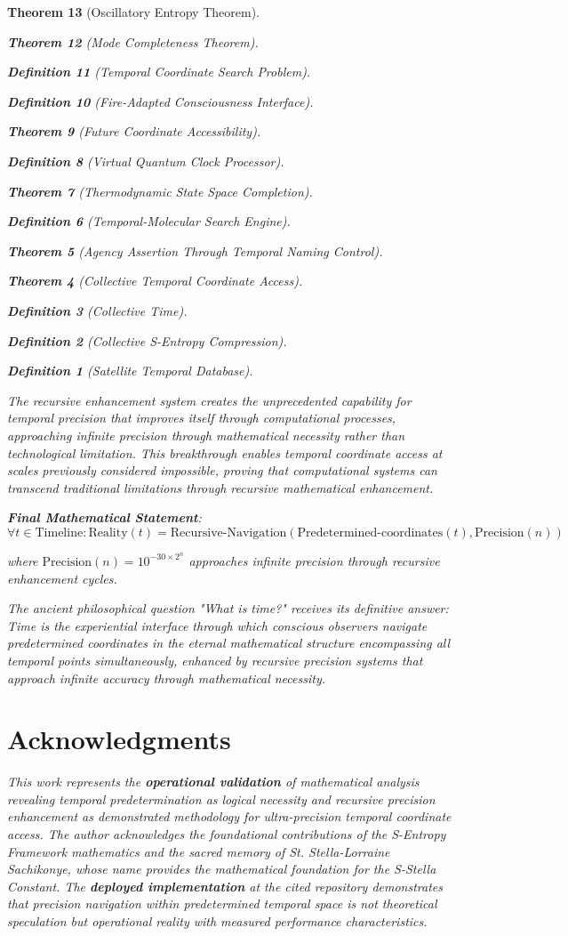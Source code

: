 \documentclass[12pt,a4paper]{article}
\newtheorem{theorem}{Theorem}[section]
\newtheorem{definition}[theorem]{Definition}
\begin{document}
\begin{theorem}[Oscillatory Entropy Theorem]
\begin{theorem}[Mode Completeness Theorem]
\begin{enumerate}
\begin{definition}[Temporal Coordinate Search Problem]
\begin{algorithm}
\begin{definition}[Fire-Adapted Consciousness Interface]
\begin{theorem}[Future Coordinate Accessibility]
\begin{definition}[Virtual Quantum Clock Processor]
\begin{itemize}
\begin{itemize}
\begin{theorem}[Thermodynamic State Space Completion]
\begin{definition}[Temporal-Molecular Search Engine]
\begin{theorem}[Agency Assertion Through Temporal Naming Control]
\begin{remark}
\begin{theorem}[Collective Temporal Coordinate Access]
\begin{definition}[Collective Time]
\begin{definition}[Collective S-Entropy Compression]
\begin{definition}[Satellite Temporal Database]
\begin{algorithm}
\begin{table}[h]
{{The recursive enhancement system creates the unprecedented capability for temporal precision that improves itself through computational processes, approaching infinite precision through mathematical necessity rather than technological limitation. This breakthrough enables temporal coordinate access at scales previously considered impossible, proving that computational systems can transcend traditional limitations through recursive mathematical enhancement.

\textbf{Final Mathematical Statement}:
$$\forall t \in \text{Timeline}: \text{Reality}(t) = \text{Recursive-Navigation}(\text{Predetermined-coordinates}(t), \text{Precision}(n))$$

where $\text{Precision}(n) = 10^{-30 \times 2^n}$ approaches infinite precision through recursive enhancement cycles.

The ancient philosophical question "What is time?" receives its definitive answer: Time is the experiential interface through which conscious observers navigate predetermined coordinates in the eternal mathematical structure encompassing all temporal points simultaneously, enhanced by recursive precision systems that approach infinite accuracy through mathematical necessity.

\section*{Acknowledgments}

This work represents the \textbf{operational validation} of mathematical analysis revealing temporal predetermination as logical necessity and recursive precision enhancement as demonstrated methodology for ultra-precision temporal coordinate access. The author acknowledges the foundational contributions of the S-Entropy Framework mathematics and the sacred memory of St. Stella-Lorraine Sachikonye, whose name provides the mathematical foundation for the S-Stella Constant. The \textbf{deployed implementation} at the cited repository demonstrates that precision navigation within predetermined temporal space is not theoretical speculation but operational reality with measured performance characteristics.

}}
\end{table}
\end{algorithm}
\end{definition}
\end{definition}
\end{definition}
\end{theorem}
\end{remark}
\end{theorem}
\end{definition}
\end{theorem}
\end{itemize}
\end{itemize}
\end{definition}
\end{theorem}
\end{definition}
\end{algorithm}
\end{definition}
\end{enumerate}
\end{theorem}
\end{theorem}
\end{document}
